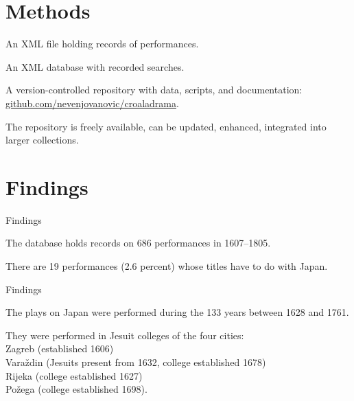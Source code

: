 \documentclass[14pt]{beamer}
\begin{document}
\section{Methods}

\begin{frame}

An XML file holding records of performances.

An XML database with recorded searches.

A version-controlled repository with data, scripts, and documentation: \href{https://github.com/nevenjovanovic/croaladrama}{github.com/nevenjovanovic/croaladrama}.

The repository is freely available, can be updated, enhanced, integrated into larger collections.

\end{frame}

\section{Findings}

\begin{frame}{Findings}

The database holds records on \alert{686} performances in 1607–1805.

There are \alert{19} performances (2.6 percent) whose titles have to do with Japan.

\end{frame}

\begin{frame}{Findings}

The plays on Japan were performed during the 133 years between 1628 and 1761. 

They were performed in Jesuit colleges of the four cities:\\
\alert{Zagreb} (established 1606)\\
\alert{Varaždin} (Jesuits present from 1632, college established 1678)\\
\alert{Rijeka} (college established 1627)\\
\alert{Požega} (college established 1698).

\end{frame}
\end{document}
